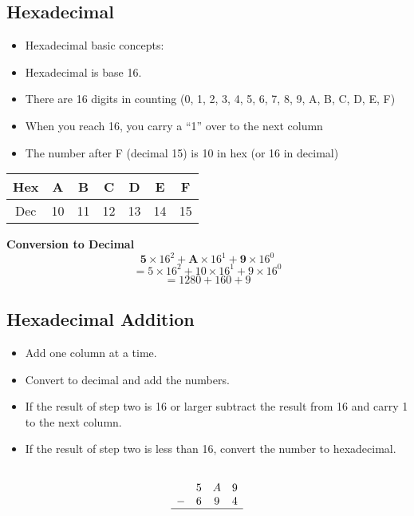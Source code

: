 
\subsection*{Hexadecimal}
\begin{itemize}
\item Hexadecimal basic concepts:	
\item Hexadecimal is base 16.  
\item There are 16 digits in counting (0, 1, 2, 3, 4, 5, 6, 7, 8, 9, A, B, C, D, E, F)
\item When you reach 16, you carry a “1” over to the next column
\item The number after F (decimal 15) is 10 in hex (or 16 in decimal)
\end{itemize}

\begin{tabular}{|c||c|c|c|c|c|c|}
\hline Hex & A & B  & C & D & E & F \\  \hline
\hline Dec & 10 & 11 & 12 & 13  &14  &15  \\  \hline
\hline 
\end{tabular} 

\textbf{Conversion to Decimal}
\[\textbf{5} \times 16^2 + \textbf{A} \times 16^1  + \textbf{9} \times 16^0\]
\[=5 \times 16^2 + 10 \times 16^1  + 9 \times 16^0\]
\[= 1280 + 160 + 9\]



\subsection*{Hexadecimal Addition}
\begin{itemize}
\item		Add one column at a time.

\item		Convert to decimal and add the numbers.

\item	If the result of step two is 16 or larger subtract the result from 16 and carry 1 to the next column.

\item	If the result of step two is less than 16, convert the number to hexadecimal.

\end{itemize}

\[\begin{array}{cccc}
	&		&		&		\\	
	&	5	&	A	&	9	\\	
	-&	6	&	9	&	4	\\	\hline
	&		&		&		\\	
\end{array}\]


